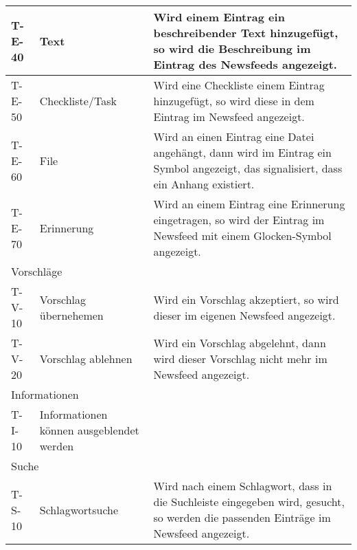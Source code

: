 \begin{tabularx}{\textwidth}{|l|X|X|}
    T-E-40 & Text & Wird einem Eintrag ein beschreibender Text hinzugefügt, so wird die Beschreibung im Eintrag des Newsfeeds angezeigt. \\ \hline
    T-E-50 & Checkliste/Task & Wird eine Checkliste einem Eintrag hinzugefügt, so wird diese in dem Eintrag im Newsfeed angezeigt. \\ \hline
    T-E-60 & File & Wird an einen Eintrag eine Datei angehängt, dann wird im Eintrag ein Symbol angezeigt, das signalisiert, dass ein Anhang existiert. \\ \hline
 	T-E-70 & Erinnerung & Wird an einem Eintrag eine Erinnerung eingetragen, so wird der Eintrag im Newsfeed mit einem Glocken-Symbol angezeigt.\\ \hline
    \multicolumn{3}{|l|}{Vorschläge}\\ \hline
    T-V-10 & Vorschlag übernehemen  & Wird ein Vorschlag akzeptiert, so wird dieser im eigenen Newsfeed angezeigt. \\ \hline
    T-V-20 & Vorschlag ablehnen & Wird ein Vorschlag abgelehnt, dann wird dieser Vorschlag nicht mehr im Newsfeed angezeigt. \\ \hline
    \multicolumn{3}{|l|}{Informationen}\\\hline
    
    T-I-10 & Informationen können ausgeblendet werden & \\ \hline
	\multicolumn{3}{|l|}{Suche}\\ \hline
	T-S-10 & Schlagwortsuche  & Wird nach einem Schlagwort, dass in die Suchleiste eingegeben wird, gesucht, so werden die passenden Einträge im Newsfeed angezeigt.\\  

    
  
	
 
  
\end{tabularx}



